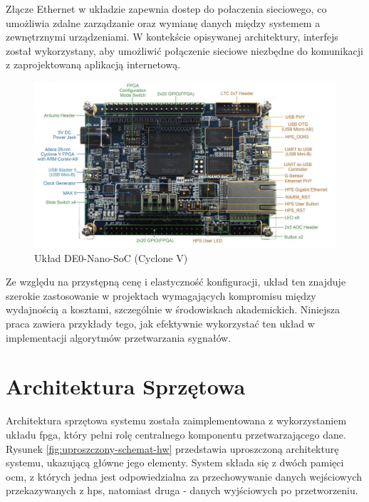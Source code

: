 Złącze Ethernet w układzie zapewnia dostep do połaczenia sieciowego, co umożliwia zdalne zarządzanie oraz wymianę danych między systemem a zewnętrznymi urządzeniami. W kontekście opisywanej architektury, interfejs został wykorzystany, aby umożliwić połączenie sieciowe niezbędne do komunikacji z zaprojektowaną aplikacją internetową.

\begin{figure}[!htb]
    \centerline{\includegraphics[scale=0.2]{de0-nano-soc.png}}
    \caption{Układ DE0-Nano-SoC (Cyclone V)}
    \label{fig:de0-nano-soc}
\end{figure}

Ze względu na przystępną cenę i elastyczność konfiguracji,
układ ten znajduje szerokie zastosowanie w projektach wymagających kompromisu między wydajnością a kosztami, szczególnie w środowiskach akademickich. Niniejsza praca zawiera przykłady tego, jak efektywnie wykorzystać ten układ w implementacji algorytmów przetwarzania sygnałów.

\section{Architektura Sprzętowa}
\label{sec:architektura-hw}

Architektura sprzętowa systemu została zaimplementowana z wykorzystaniem układu \ac{fpga}, który pełni rolę centralnego komponentu przetwarzającego dane. Rysunek \ref{fig:uproszczony-schemat-hw} przedstawia uproszczoną architekturę systemu, ukazującą główne jego elementy. System składa się z dwóch pamięci \ac{ocm}, z których jedna jest odpowiedzialna za przechowywanie danych wejściowych przekazywanych z \ac{hps}, natomiast druga - danych wyjściowych po przetworzeniu.

